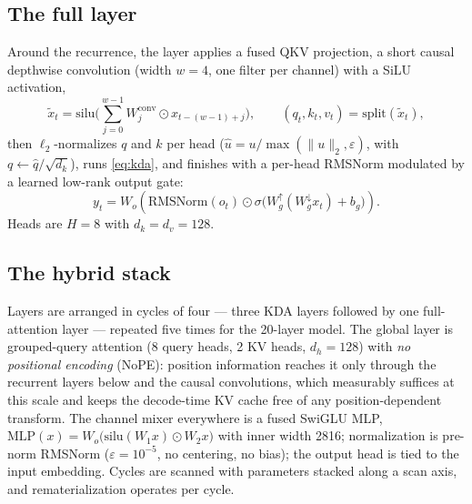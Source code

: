 \subsection{The full layer}

Around the recurrence, the layer applies a fused QKV projection, a
short causal depthwise convolution (width $w{=}4$, one filter per
channel) with a SiLU activation,
\begin{equation}
\tilde{x}_t = \mathrm{silu}\!\Big(\textstyle\sum_{j=0}^{w-1}
W^{\mathrm{conv}}_j \odot x_{t-(w-1)+j}\Big),
\qquad (q_t, k_t, v_t) = \mathrm{split}(\tilde{x}_t),
\end{equation}
then $\ell_2$-normalizes $q$ and $k$ per head
($\hat{u} = u / \max(\lVert u \rVert_2, \varepsilon)$, with
$q \leftarrow \hat{q}/\sqrt{d_k}$), runs \eqref{eq:kda}, and finishes
with a per-head RMSNorm modulated by a learned low-rank output gate:
\begin{equation}
y_t = W_o\left(\mathrm{RMSNorm}(o_t) \odot
\sigma\!\big(W_g^{\uparrow} (W_g^{\downarrow} x_t) + b_g\big)\right).
\end{equation}
Heads are $H = 8$ with $d_k = d_v = 128$.

\subsection{The hybrid stack}

Layers are arranged in cycles of four --- three KDA layers followed by
one full-attention layer --- repeated five times for the 20-layer model.
The global layer is grouped-query attention (8 query heads, 2 KV heads,
$d_h = 128$) with \emph{no positional encoding} (NoPE): position
information reaches it only through the recurrent layers below and the
causal convolutions, which measurably suffices at this scale and keeps
the decode-time KV cache free of any position-dependent transform. The
channel mixer everywhere is a fused SwiGLU MLP,
$\mathrm{MLP}(x) = W_o\big(\mathrm{silu}(W_1 x) \odot W_2 x\big)$ with
inner width 2816; normalization is pre-norm RMSNorm
($\varepsilon = 10^{-5}$, no centering, no bias); the output head is
tied to the input embedding. Cycles are scanned with parameters stacked
along a scan axis, and rematerialization operates per cycle.

